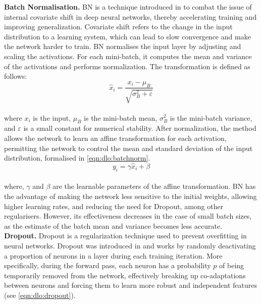 \noindent \textbf{Batch Normalisation.} \ac{BN} is a technique introduced in
\cite{DBLP:conf/icml/IoffeS15} to combat the issue of internal covariate shift
in deep neural networks, thereby accelerating training and improving
generalization. Covariate shift refers to the change in the input distribution
to a learning system, which can lead to slow convergence and make the network
harder to train. \ac{BN} normalises the input layer by adjusting and scaling the
activations. For each mini-batch, it computes the mean and variance of the
activations and performs normalization. The transformation is defined as
follows:\\

\begin{equation}
  \label{eqn:dlo:batchnorm}
  \hat{x}_{i} = \frac{x_{i} - \mu_{B}}{\sqrt{\sigma_{B}^{2} + \varepsilon}}
\end{equation}\\

\noindent where $x_{i}$ is the input, $\mu_{B}$ is the mini-batch mean,
$\sigma_{B}^{2}$ is the mini-batch variance, and $\varepsilon$ is a small
constant for numerical stability. After normalization, the method allows the
network to learn an affine transformation for each activation, permitting the
network to control the mean and standard deviation of the input distribution,
formalised in \cref{eqn:dlo:batchnorm}.\\

\begin{equation}
  \label{eqn:dlo:batchnorm_affine}
  y_{i} = \gamma \hat{x}_{i} + \beta
\end{equation}\\

\noindent where, $\gamma$ and $\beta$ are the learnable parameters of the affine
transformation. \ac{BN} has the advantage of making the network less sensitive
to the initial weights, allowing higher learning rates, and reducing the need
for Dropout, among other regularisers. However, its effectiveness decreases in
the case of small batch sizes, as the estimate of the batch mean and variance
becomes less accurate.\\

\noindent \textbf{Dropout.} Dropout is a regularization technique used to
prevent overfitting in neural networks. Dropout was introduced in
\cite{DBLP:journals/jmlr/SrivastavaHKSS14} and works by randomly deactivating a
proportion of neurons in a layer during each training iteration. More
specifically, during the forward pass, each neuron has a probability $p$ of
being temporarily removed from the network, effectively breaking up
co-adaptations between neurons and forcing them to learn more robust and
independent features (see \cref{eqn:dlo:dropout}).\\

